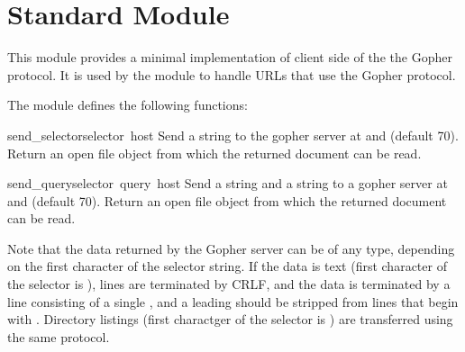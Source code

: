 \section{Standard Module }
\label{module-gopherlib}

\renewcommand{\indexsubitem}{(in module gopherlib)}

This module provides a minimal implementation of client side of the
the Gopher protocol.  It is used by the module  to handle
URLs that use the Gopher protocol.

The module defines the following functions:

\begin{funcdesc}{send_selector}{selector\, host}
Send a  string to the gopher server at  and
 (default 70).  Return an open file object from which the
returned document can be read.
\end{funcdesc}

\begin{funcdesc}{send_query}{selector\, query\, host}
Send a  string and a  string to a gopher
server at  and  (default 70).  Return an open file
object from which the returned document can be read.
\end{funcdesc}

Note that the data returned by the Gopher server can be of any type,
depending on the first character of the selector string.  If the data
is text (first character of the selector is ), lines are
terminated by CRLF, and the data is terminated by a line consisting of
a single , and a leading  should be stripped from
lines that begin with .  Directory listings (first charactger
of the selector is ) are transferred using the same protocol.
